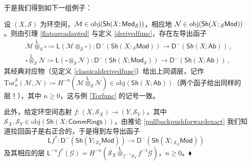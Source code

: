 于是我们得到如下一组例子：

\begin{Ex}\label{derivedtensorfunc}
设 $(X,\mathcal{S})$ 为环空间，$\mathcal{M}\in\textup{obj}(\mathsf{Sh}(X;\mathsf{Mod}_\mathcal{S}))$，相应地 $\mathcal{N}\in\textup{obj}(\mathsf{Sh}(X;{}_\mathcal{S}\mathsf{Mod}))$。则由引理 \ref{flatsareadapted} 与定义 \ref{derivedfunc}，存在左导出函子
\begin{equation}
	\begin{aligned}
		&\mathcal{M}\overset{\mathsf{L}}{\otimes}_\mathcal{S}\square\coloneqq\mathsf{L}(\mathcal{M}\otimes_\mathcal{S}\square):\mathsf{D^-}(\mathsf{Sh}(X;{}_\mathcal{S}\mathsf{Mod}))\rightarrow\mathsf{D^-}(\mathsf{Sh}(X;\mathsf{Ab}))\,, \\ &\square\overset{\mathsf{L}}{\otimes}_\mathcal{S}\mathcal{N}\coloneqq\mathsf{L}(\square\otimes_\mathcal{S}\mathcal{N}):\mathsf{D^-}(\mathsf{Sh}(X;\mathsf{Mod}_\mathcal{S}))\rightarrow\mathsf{D^-}(\mathsf{Sh}(X;\mathsf{Ab}))\,,
	\end{aligned}
\end{equation}
其经典对应物（见定义 \ref{classicalderivedfunc}）给出上同调层，记作 $\text{Tor}_n^\mathcal{S}(\mathcal{M},\mathcal{N})\coloneqq H^{-n}(\mathcal{M}\overset{\mathsf{L}}{\otimes}_\mathcal{S}\mathcal{N})\in\text{obj}(\mathsf{Sh}(X;\mathsf{Ab}))$（两个函子给出同样的层！），其中 $n\geq 0$，这与例 \ref{Torfunc} 的记号一致。

此外，给定环空间态射 $f:(X,\mathcal{S}_X)\rightarrow (Y,\mathcal{S}_Y)$，其中 $\mathcal{S}_X,\mathcal{S}_Y\in\text{obj}(\mathsf{Sh}(X;\mathsf{CommRings}))$，由推论 \ref{pullbackpushforwardexact} 我们知道拉回函子是右正合的，于是得到左导出函子
\begin{equation}
	\mathsf{L}f^*:\mathsf{D^-}(\mathsf{Sh}(Y;{}_{\mathcal{S}_Y}\!\mathsf{Mod}))\rightarrow\mathsf{D^-}(\mathsf{Sh}(X;{}_{\mathcal{S}_X}\!\mathsf{Mod}))
\end{equation}
及其相应的层 $\mathsf{L}^{-n}f^*(\mathcal{G})=H^{-n}(\mathcal{S}_X\overset{\mathsf{L}}{\otimes}_{f^{\!-\!1}\mathcal{S}_Y} f^{-1}\mathcal{G})$，$n\geq 0$。\hfill $\blacklozenge$
\end{Ex}


